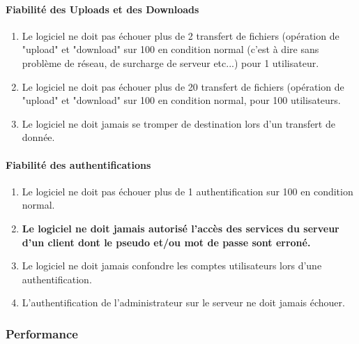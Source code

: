 \documentclass[10pt,a4paper]{report}
\begin{document}
\paragraph{Fiabilité des Uploads et des Downloads}
	\begin{enumerate}
		\item Le logiciel ne doit pas échouer plus de 2 transfert de fichiers (opération de "upload" et "download" sur 100 en condition normal (c'est à dire sans problème de réseau, de surcharge de serveur etc...) pour 1 utilisateur.
		\item Le logiciel ne doit pas échouer plus de 20 transfert de fichiers (opération de "upload" et "download" sur 100 en condition normal, pour 100 utilisateurs.
		\item Le logiciel ne doit jamais se tromper de destination lors d'un transfert de donnée.
	\end{enumerate}		 

\paragraph{Fiabilité des authentifications}

	\begin{enumerate}
	
		\item Le logiciel ne doit pas échouer plus de 1 authentification sur 100 en condition normal.
		
		\item \textbf{Le logiciel ne doit jamais autorisé l'accès des services du serveur d'un client dont le pseudo et/ou mot de passe sont erroné.}
		
		\item Le logiciel ne doit jamais confondre les comptes utilisateurs lors d'une authentification.
		
		\item L'authentification de l'administrateur sur le serveur ne doit jamais échouer.
		
	\end{enumerate}

\subsubsection{Performance}

\end{document}
